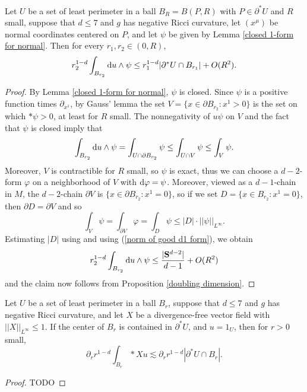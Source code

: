 \begin{lemma}\label{scalar curvature monotonicity}
Let $U$ be a set of least perimeter in a ball $B_R = B(P, R)$ with $P \in \partial^* U$ and $R$ small, suppose that $d \leq 7$ and $g$ has negative Ricci curvature, let $(x^\mu)$ be normal coordinates centered on $P$, and let $\psi$ be given by Lemma \ref{closed 1-form for normal}.
Then for every $r_1, r_2 \in (0, R)$,
$$r_2^{1 - d}\int_{B_{r_2}} \mathop{}\!\mathrm{d} u \wedge \psi \leq r_1^{1 - d}|\partial^*U \cap B_{r_1}| + O(R^2).$$
\end{lemma}
\begin{proof}
By Lemma \ref{closed 1-form for normal}, $\psi$ is closed.
Since $\psi$ is a positive function times $\partial_{x^1}$, by Gauss' lemma the set $V = \{x \in \partial B_{r_2}: x^1 > 0\}$ is the set on which $*\psi > 0$, at least for $R$ small.
The nonnegativity of $u\psi$ on $V$ and the fact that $\psi$ is closed imply that
$$\int_{B_{r_2}} \mathop{}\!\mathrm{d} u \wedge \psi = \int_{U \cap \partial B_{r_2}} \psi \leq \int_{U \cap V} \psi \leq \int_V \psi.$$
Moreover, $V$ is contractible for $R$ small, so $\psi$ is exact, thus we can choose a $d-2$-form $\varphi$ on a neighborhood of $V$ with $\mathop{}\!\mathrm{d} \varphi = \psi$.
Moreover, viewed as a $d-1$-chain in $M$, the $d-2$-chain $\partial V$ is $\{x \in \partial B_{r_2}: x^1 = 0\}$, so if we set $D = \{x \in B_{r_2}: x^1 = 0\}$, then $\partial D = \partial V$ and so
$$\int_V \psi = \int_{\partial V} \varphi = \int_D \psi \leq |D| \cdot ||\psi||_{L^\infty}.$$
Estimating $|D|$ using \cite{gray1974volume} and using (\ref{norm of good d1 form}), we obtain
$$r_2^{1 - d} \int_{B_{r_2}} \mathop{}\!\mathrm{d} u \wedge \psi \leq \frac{|\mathbf S^{d - 2}|}{d - 1} + O(R^2)$$
and the claim now follows from Proposition \ref{doubling dimension}.
\end{proof}

\begin{lemma}\label{bounding the G}
Let $U$ be a set of least perimeter in a ball $B_r$, suppose that $d \leq 7$ and $g$ has negative Ricci curvature, and let $X$ be a divergence-free vector field with $||X||_{L^\infty} \leq 1$.
If the center of $B_r$ is contained in $\partial^* U$, and $u = 1_U$, then for $r > 0$ small,
$$\partial_r r^{1 - d} \int_{B_r} *Xu \lesssim \partial_r r^{1 - d} |\partial^* U \cap B_r|.$$
\end{lemma}
\begin{proof}
TODO
\end{proof}



